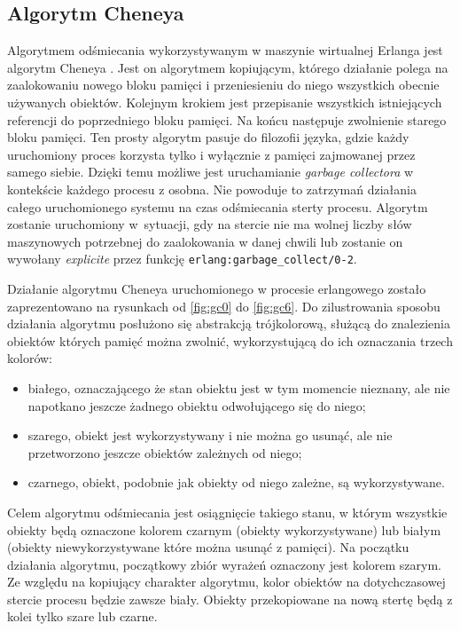 \subsection{Algorytm Cheneya}
\label{sub:gcCheney}

Algorytmem odśmiecania wykorzystywanym w maszynie wirtualnej Erlanga jest algorytm Cheneya \cite{Cheney1970}.
Jest on algorytmem kopiującym, którego działanie polega na zaalokowaniu nowego bloku pamięci i przeniesieniu do niego wszystkich obecnie używanych obiektów.
Kolejnym krokiem jest przepisanie wszystkich istniejących referencji do poprzedniego bloku pamięci.
Na końcu następuje zwolnienie starego bloku pamięci.
Ten prosty algorytm pasuje do filozofii języka, gdzie każdy uruchomiony proces korzysta tylko i wyłącznie z pamięci zajmowanej przez samego siebie.
Dzięki temu możliwe jest uruchamianie \emph{garbage collectora} w kontekście każdego procesu z osobna.
Nie powoduje to zatrzymań działania całego uruchomionego systemu na czas odśmiecania sterty procesu.
Algorytm zostanie uruchomiony w~sytuacji, gdy na stercie nie ma wolnej liczby słów maszynowych potrzebnej do zaalokowania w danej chwili lub zostanie on wywołany \emph{explicite} przez funkcję \texttt{erlang:garbage\_collect/0-2}.

Działanie algorytmu Cheneya uruchomionego w procesie erlangowego zostało zaprezentowano na rysunkach od \ref{fig:gc0} do \ref{fig:gc6}.
Do zilustrowania sposobu działania algorytmu posłużono się abstrakcją trójkolorową, służącą do znalezienia obiektów których pamięć można zwolnić, wykorzystującą do ich oznaczania trzech kolorów:
\begin{itemize}
\item białego, oznaczającego że stan obiektu jest w tym momencie nieznany, ale nie napotkano jeszcze żadnego obiektu odwołującego się do niego;
\item szarego, obiekt jest wykorzystywany i nie można go usunąć, ale nie przetworzono jeszcze obiektów zależnych od niego;
\item czarnego, obiekt, podobnie jak obiekty od niego zależne, są wykorzystywane.
\end{itemize}
Celem algorytmu odśmiecania jest osiągnięcie takiego stanu, w którym wszystkie obiekty będą oznaczone kolorem czarnym (obiekty wykorzystywane) lub białym (obiekty niewykorzystywane które można usunąć z pamięci).
Na początku działania algorytmu, początkowy zbiór wyrażeń oznaczony jest kolorem szarym.
Ze względu na kopiujący charakter algorytmu, kolor obiektów na dotychczasowej stercie procesu będzie zawsze biały.
Obiekty przekopiowane na nową stertę będą z kolei tylko szare lub czarne.

